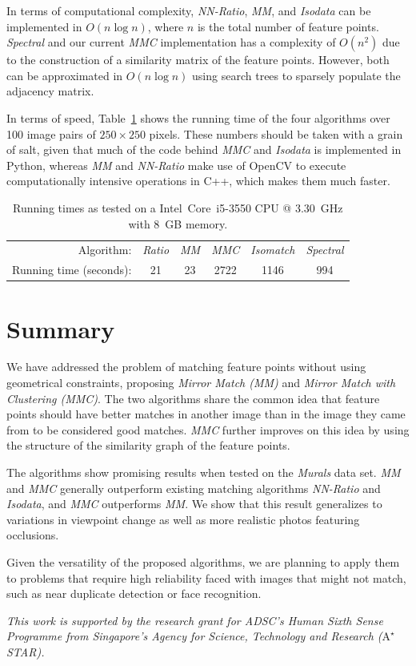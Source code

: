 \documentclass[conference]{IEEEtran}
\begin{document}
In terms of computational complexity, \emph{NN-Ratio}, \emph{MM}, and 
\emph{Isodata} can be implemented in $O(n\log n)$, where $n$ is the 
total number of feature points.  \emph{Spectral} and our current 
\emph{MMC} implementation has a complexity of $O(n^2)$ due to the 
construction of a similarity matrix of the feature points. However, both
can be approximated in $O(n\log n)$ using search trees to sparsely 
populate the adjacency matrix.  

In terms of speed, Table~\ref{table:running_times} shows the 
running time of the four algorithms over 100 image pairs of $250\!\times\!250$ pixels. 
These numbers should be taken with a grain of salt, given that 
much of the code behind \emph{MMC} and \emph{Isodata} is implemented in 
Python, whereas \emph{MM} and \emph{NN-Ratio} make use of OpenCV to 
execute computationally intensive operations in C++, which makes them 
much faster. 

\begin{table}[htb]
\caption{Running times as tested on a Intel\textregistered\ Core\texttrademark\ i5-3550 CPU @ 
3.30~GHz with 8~GB memory.}
\label{table:running_times}
	\centering
\begin{tabular}{r*{5}{c}}
\hline
	Algorithm: & \emph{Ratio} & \emph{MM} & \emph{MMC} %
& \emph{Isomatch} & \emph{Spectral}	\\
	\noalign{\smallskip} 
	Running time (seconds): & 21 & 23 & 2722 & 1146 & 994\\
	\hline
\end{tabular}
\end{table}
%

\section{Summary}
\label{S:Summary}

We have addressed the problem of matching feature points without using 
geometrical constraints, proposing \emph{Mirror Match 
(MM)} and \emph{Mirror Match with Clustering (MMC)}.  The two algorithms 
share the common idea that feature points should have better 
matches in another image than in the image they came from to be 
considered good matches.  \emph{MMC} further improves on this idea by 
using the structure of the similarity graph of the feature points. 

The algorithms show promising results when tested on the \emph{Murals} 
data set. \emph{MM} and \emph{MMC} generally outperform existing 
matching algorithms \emph{NN-Ratio} and \emph{Isodata}, and \emph{MMC} 
outperforms \emph{MM}. We show that this result generalizes to 
variations in viewpoint change as well as more realistic photos 
featuring occlusions. 

Given the versatility of the proposed algorithms, we are planning to 
apply them to problems that require high reliability faced with images 
that might not match, such as near duplicate detection or face 
recognition.

\textit{This work is supported by the research grant for ADSC's Human 
Sixth Sense Programme from Singapore's Agency for Science, Technology 
and Research ($\text{A}^\star$STAR).}
%


\end{document}
